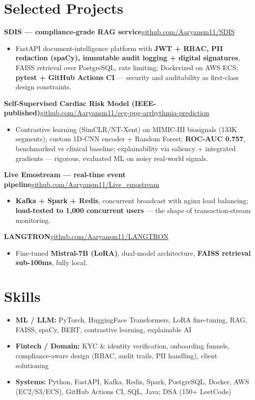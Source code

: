 \documentclass[10pt,a4paper]{article}
\begin{document}
\section*{Selected Projects}
\vspace{1pt}\textbf{SDIS --- compliance-grade RAG service}\hfill {\small\href{https://github.com/Aaryansm11/SDIS}{github.com/Aaryansm11/SDIS}}
\begin{itemize}
\item FastAPI document-intelligence platform with \textbf{JWT + RBAC, PII redaction (spaCy), immutable audit logging + digital signatures}, FAISS retrieval over PostgreSQL, rate limiting; Dockerized on AWS ECS; \textbf{pytest + GitHub Actions CI} --- security and auditability as first-class design constraints.
\end{itemize}
\vspace{1pt}\textbf{Self-Supervised Cardiac Risk Model (IEEE-published)}\hfill {\small\href{https://github.com/Aaryansm11/ecg-ppg-arrhythmia-prediction}{github.com/Aaryansm11/ecg-ppg-arrhythmia-prediction}}
\begin{itemize}
\item Contrastive learning (SimCLR/NT-Xent) on MIMIC-III biosignals (133K segments); custom 1D-CNN encoder + Random Forest; \textbf{ROC-AUC 0.757}, benchmarked vs clinical baseline; explainability via saliency + integrated gradients --- rigorous, evaluated ML on noisy real-world signals.
\end{itemize}
\vspace{1pt}\textbf{Live Emostream --- real-time event pipeline}\hfill {\small\href{https://github.com/Aaryansm11/Live_emostream}{github.com/Aaryansm11/Live\_emostream}}
\begin{itemize}
\item \textbf{Kafka + Spark + Redis}, concurrent broadcast with nginx load balancing; \textbf{load-tested to 1,000 concurrent users} --- the shape of transaction-stream monitoring.
\end{itemize}
\vspace{1pt}\textbf{LANGTRON}\hfill {\small\href{https://github.com/Aaryansm11/LANGTRON}{github.com/Aaryansm11/LANGTRON}}
\begin{itemize}
\item Fine-tuned \textbf{Mistral-7B (LoRA)}, dual-model architecture, \textbf{FAISS retrieval sub-100ms}, fully local.
\end{itemize}
\section*{Skills}
\begin{itemize}
\item \textbf{ML / LLM:} PyTorch, HuggingFace Transformers, LoRA fine-tuning, RAG, FAISS, spaCy, BERT, contrastive learning, explainable AI
\item \textbf{Fintech / Domain:} KYC \& identity verification, onboarding funnels, compliance-aware design (RBAC, audit trails, PII handling), client solutioning
\item \textbf{Systems:} Python, FastAPI, Kafka, Redis, Spark, PostgreSQL, Docker, AWS (EC2/S3/ECS), GitHub Actions CI, SQL, Java; DSA (150+ LeetCode)
\end{itemize}
\end{document}
